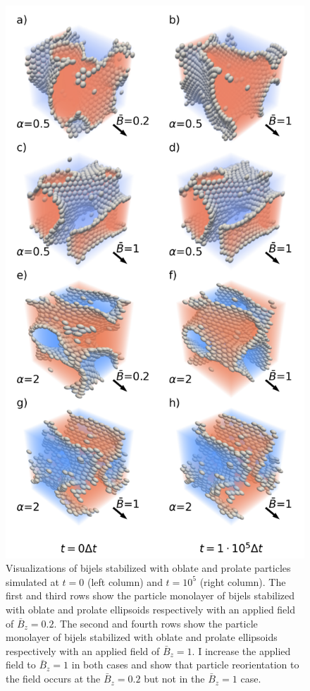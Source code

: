 \begin{figure}
\centering 
\includegraphics[scale=0.4]{../figures/results/paper2/microstructure_viz-field_up.png} 
\caption{Visualizations of bijels stabilized with oblate and prolate particles simulated at $t = 0$ (left column) and $t = 10^5$ (right column). 
         The first and third rows show the particle monolayer of bijels stabilized with oblate and prolate ellipsoids respectively with an applied 
         field of $\bar{B}_z = 0.2$. The second and fourth rows show the particle monolayer of bijels stabilized with oblate and prolate ellipsoids 
         respectively with an applied field of $\bar{B}_z = 1$. I increase the applied field to $\bar{B}_z = 1$ in both cases and show that particle 
         reorientation to the field occurs at the $\bar{B}_z = 0.2$ but not in the $\bar{B}_z = 1$ case.}
\label{fig:microstructure_viz-field_up}
\end{figure}


